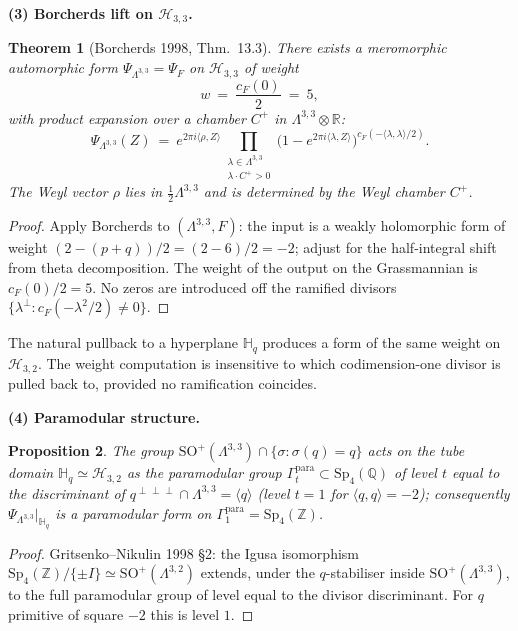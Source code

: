 \documentclass[11pt]{article}
\providecommand{\Lat}{\Lambda}
\providecommand{\Z}{\mathbb{Z}}
\providecommand{\Q}{\mathbb{Q}}
\providecommand{\R}{\mathbb{R}}
\providecommand{\HH}{\mathbb{H}}
\providecommand{\cH}{\mathcal{H}}
\providecommand{\SO}{\mathrm{SO}}
\providecommand{\Sp}{\mathrm{Sp}}
\theoremstyle{plain}
\newtheorem{theorem}{Theorem}
\newtheorem{proposition}[theorem]{Proposition}
\theoremstyle{definition}
\begin{document}
\textbf{(3) Borcherds lift on $\cH_{3,3}$.}
\begin{theorem}[Borcherds 1998, Thm.~13.3]\label{thm:B98-lift}
There exists a meromorphic automorphic form
$\Psi_{\Lat^{3,3}}=\Psi_F$ on $\cH_{3,3}$ of weight
\[
w\ =\ \frac{c_F(0)}{2}\ =\ 5,
\]
with product expansion over a chamber $C^+$ in
$\Lat^{3,3}\otimes\R$:
\[
\Psi_{\Lat^{3,3}}(Z)\ =\ e^{2\pi i\langle\rho,Z\rangle}
\prod_{\substack{\lambda\in\Lat^{3,3}\\ \lambda\cdot C^+>0}}
\bigl(1-e^{2\pi i\langle\lambda,Z\rangle}\bigr)^{c_F(-\langle\lambda,\lambda\rangle/2)}.
\]
The Weyl vector $\rho$ lies in $\tfrac12\Lat^{3,3}$ and is determined
by the Weyl chamber $C^+$.
\end{theorem}
\begin{proof}
Apply Borcherds \cite[Thm.~13.3]{Bor98} to $(\Lat^{3,3},F)$: the input
is a weakly holomorphic form of weight $(2-(p+q))/2=(2-6)/2=-2$; adjust
for the half-integral shift from theta decomposition. The weight of the
output on the Grassmannian is $c_F(0)/2=5$. No zeros are introduced off
the ramified divisors $\{\lambda^\perp: c_F(-\lambda^2/2)\ne0\}$.
\end{proof}

\begin{remark}
The natural pullback to a hyperplane $\HH_q$ produces a form of the
same weight on $\cH_{3,2}$. The weight computation is insensitive to
which codimension-one divisor is pulled back to, provided no
ramification coincides.
\end{remark}

\textbf{(4) Paramodular structure.}
\begin{proposition}\label{prop:paramodular}
The group $\SO^+(\Lat^{3,3})\cap\{\sigma:\sigma(q)=q\}$ acts on the
tube domain $\HH_q\simeq\cH_{3,2}$ as the paramodular group
$\Gamma_t^{\mathrm{para}}\subset\Sp_4(\Q)$ of level $t$ equal to the
discriminant of $q^{\perp\perp\perp}\cap\Lat^{3,3}=\langle q\rangle$
(level $t=1$ for $\langle q,q\rangle=-2$); consequently
$\Psi_{\Lat^{3,3}}|_{\HH_q}$ is a paramodular form on
$\Gamma_1^{\mathrm{para}}=\Sp_4(\Z)$.
\end{proposition}
\begin{proof}
Gritsenko--Nikulin 1998 \S 2: the Igusa isomorphism
$\Sp_4(\Z)/\{\pm I\}\simeq\SO^+(\Lat^{3,2})$ extends, under the
$q$-stabiliser inside $\SO^+(\Lat^{3,3})$, to the full paramodular
group of level equal to the divisor discriminant. For $q$ primitive
of square $-2$ this is level $1$.
\end{proof}
\end{document}
